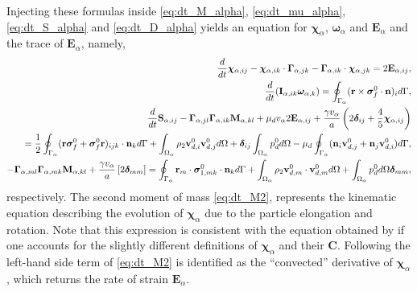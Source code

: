 Injecting these formulas inside \ref{eq:dt_M_alpha}, \ref{eq:dt_mu_alpha}, \ref{eq:dt_S_alpha} and \ref{eq:dt_D_alpha}  yields an equation for $\bm\chi_\alpha$, $\bm\omega_\alpha$ and $\textbf{E}_\alpha$ and the trace of $\textbf{E}_\alpha$, namely,
\begin{align}
    \ddt \bm\chi_{\alpha,ij}
    -\bm\chi_{\alpha,ik} \cdot \bm\Gamma_{\alpha,jk}
    - \bm\Gamma_{\alpha,ik} \cdot \bm\chi_{\alpha,jk}
    =
    2\textbf{E}_{\alpha,ij},
    \label{eq:dt_M2}
    \\
    \ddt (\textbf{I}_{\alpha,ik}\bm\omega_{\alpha,k} )
    = 
    \intS{(\textbf{r}\times\bm\sigma_f^0\cdot \textbf{n})_i},
    \label{eq:dt_mu2}
    \\
    \ddt \textbf{S}_{\alpha,ij}
    -  \bm\Gamma_{\alpha,jl}\bm\Gamma_{\alpha,ik} \textbf{M}_{\alpha,kl}  
    + \mu_d v_\alpha 2\textbf{E}_{\alpha,ij}
    + \frac{\gamma v_\alpha }{a} \left(
    2\bm\delta_{ij} 
    + \frac{4 }{5} \bm\chi_{\alpha,ij}
    \right)\nonumber\\
    = 
    \frac{1}{2}\intS{(\textbf{r}\bm\sigma_f^0 + \bm\sigma_f^0\textbf{r})_{ijk}\cdot \textbf{n}_k} 
    + \intO{\rho_2 \textbf{v}_{d,i}^0\textbf{v}_{d,j}^0}
    + \bm\delta_{ij}\intO{p_d^0} 
    - \mu_d \intS{(\textbf{n}_i \textbf{v}_{d,j}^0 + \textbf{n}_j \textbf{v}_{d,i}^0)},
    \label{eq:dt_S2}
    \\
    \label{eq:dt_trM2}
    -  \bm\Gamma_{\alpha,ml}\bm\Gamma_{\alpha,mk} \textbf{M}_{\alpha,kl}  
    + \frac{\gamma v_\alpha }{a} 
    \left[
    2\bm\delta_{mm} 
    \right]
    = 
    \intS{\textbf{r}_m\cdot\bm\sigma_{1,mk}^0\cdot \textbf{n}_k} 
    + \intO{\rho_2 \textbf{v}_{d,m}^0\cdot \textbf{v}_{d,m}^0}
    + \intO{p_d^0} \bm\delta_{mm},
\end{align}
respectively. 
The second moment of mass \ref{eq:dt_M2}, represents the kinematic equation describing the evolution of $\bm\chi_\alpha$ due to the particle elongation and rotation. 
Note that this expression is consistent with the equation obtained by \citet{goddard1967nonlinear} if one accounts for the slightly different definitions of $\bm\chi_\alpha$ and their \textbf{C}.
Following \citet{goddard1967nonlinear} the left-hand side term of \ref{eq:dt_M2} is identified as the ``convected'' derivative of $\bm\chi_\alpha$, which returns the rate of strain $\textbf{E}_\alpha$. 
